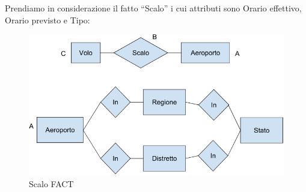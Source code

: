 Prendiamo in considerazione il fatto “Scalo” i cui attributi sono Orario effettivo, Orario previsto e Tipo:   

\begin{center}
\begin{figure}[H]
\centering
\includegraphics[scale=0.8]{figures/scalo_aeroporto.png}
\caption{Scalo FACT}
\end{figure}
\end{center}

